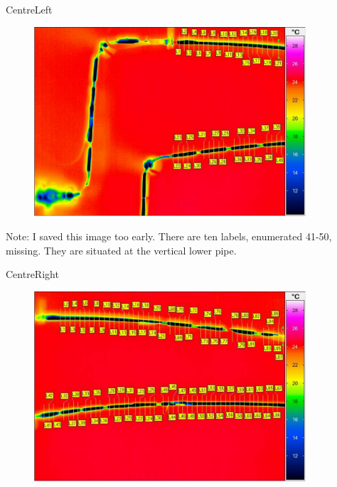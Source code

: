 \documentclass[10pt]{beamer}
\begin{document}
\begin{frame}{CentreLeft}
	\begin{figure}
		\centering
		\includegraphics[width=0.9\textwidth]{../Labels/LabelsCentreLeft.pdf}
	\end{figure}
Note: I saved this image too early. There are ten labels, enumerated 41-50, missing. They are situated at the vertical lower pipe.
\end{frame}
\begin{frame}{CentreRight}
	\begin{figure}
		\centering
		\includegraphics[width=0.9\textwidth]{../Labels/LabelsCentreRight.pdf}
	\end{figure}
\end{frame}
\end{document}
